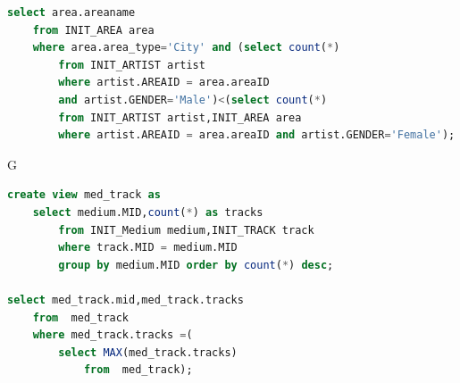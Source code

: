 \documentclass[11pt]{article} %
\begin{document}
{\begin{lstlisting}[language=SQL, keywordstyle=\color{blue!70},
commentstyle=\color{red!50!green!50!blue!50},
rulesepcolor=\color{red!20!green!20!blue!20},
frame=shadowbox]
select area.areaname
	from INIT_AREA area
	where area.area_type='City' and (select count(*)
		from INIT_ARTIST artist
		where artist.AREAID = area.areaID
		and artist.GENDER='Male')<(select count(*)
		from INIT_ARTIST artist,INIT_AREA area
		where artist.AREAID = area.areaID and artist.GENDER='Female');
\end{lstlisting}
G
\begin{lstlisting}[language=SQL, keywordstyle=\color{blue!70},
commentstyle=\color{red!50!green!50!blue!50},
rulesepcolor=\color{red!20!green!20!blue!20},
frame=shadowbox]
create view med_track as
	select medium.MID,count(*) as tracks
		from INIT_Medium medium,INIT_TRACK track
		where track.MID = medium.MID
		group by medium.MID order by count(*) desc;

select med_track.mid,med_track.tracks
	from  med_track 
	where med_track.tracks =(
  		select MAX(med_track.tracks)
  			from  med_track);
\end{lstlisting}


}
\end{document}
